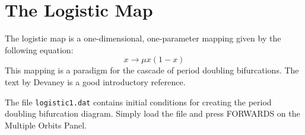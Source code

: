 \section{The Logistic Map}

The logistic map is a one-dimensional, one-parameter
mapping given by the following equation:
\[
	x \rightarrow \mu x (1-x)
\]
This mapping is a paradigm for the cascade of period
doubling bifurcations.  The text by Devaney \cite{Devaney} is a
good introductory reference.

The file {\tt logistic1.dat} contains initial conditions for creating
the period doubling bifurcation diagram.  Simply load the
file and press FORWARDS on the Multiple Orbits Panel.

